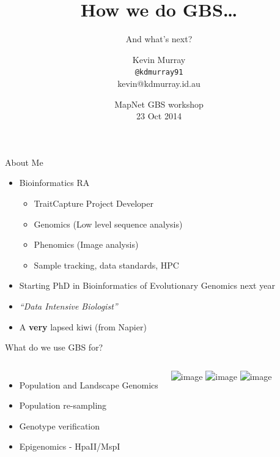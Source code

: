 \documentclass{beamer}
\title{How we do GBS\ldots}
\subtitle{And what's next?}
\author{Kevin Murray\\\tiny{\texttt{@kdmurray91}\\kevin@kdmurray.id.au}}
\institute{Borevitz Lab, ANU}
\date{MapNet GBS workshop\\23 Oct 2014}
\begin{document}
{
\begin{frame}
  \titlepage
  \vfill
\end{frame}
}

\begin{frame}{About Me}
  \begin{itemize}
    \item Bioinformatics RA
    \begin{itemize}
      \item TraitCapture Project Developer
      \item Genomics (Low level sequence analysis)
      \item Phenomics (Image analysis)
      \item Sample tracking, data standards, HPC
    \end{itemize}
    \item Starting PhD in Bioinformatics of Evolutionary Genomics next
      year
    \item \textit{``Data Intensive Biologist''}
    \pause
    \item A \textbf{very} lapsed kiwi (from Napier)
  \end{itemize}
\end{frame}

\begin{frame}{What do we use GBS for?}
  \begin{columns}[c]
    \begin{itemize}
      \item Population and Landscape Genomics
      \item Population re-sampling
      \item Genotype verification
      \item Epigenomics - HpaII/MspI
    \end{itemize}
    \includegraphics<1>[width=0.8\textwidth]{img/landscape_genomics.png}
    \includegraphics<2>[width=0.7\textwidth]{img/resampling.png}
    \includegraphics<3>[width=0.8\textwidth]{img/expt.png}
  \end{columns}
  \vfill
\end{frame}
\end{document}
